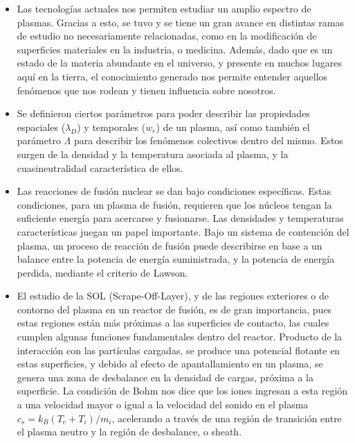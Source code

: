 \documentclass[../main.tex]{subfiles}
\begin{document}
\begin{itemize}
    \item Las tecnologías actuales nos permiten estudiar un amplio espectro de plasmas. Gracias a esto, se tuvo y se tiene un gran avance en distintas ramas de estudio no necesariamente relacionadas, como en la modificación de superficies materiales en la industria, o medicina. Además, dado que es un estado de la materia abundante en el universo, y presente en muchos lugares aquí en la tierra, el conocimiento generado nos permite entender aquellos fenómenos que nos rodean y tienen influencia sobre nosotros.
    \item Se definieron ciertos parámetros para poder describir las propiedades espaciales ($\lambda_D$) y temporales ($w_e$) de un plasma, así como también el parámetro $\Lambda$ para describir los fenómenos colectivos dentro del mismo. Estos surgen de la densidad y la temperatura asociada al plasma, y la cuasineutralidad característica de ellos. 
    \item Las reacciones de fusión nuclear se dan bajo condiciones específicas. Estas condiciones, para un plasma de fusión, requieren que los núcleos tengan la suficiente energía para acercarse y fusionarse.  Las densidades y temperaturas características juegan un papel importante. Bajo un sistema de contención del plasma, un proceso de reacción de fusión puede describirse en base a un balance entre la potencia de energía suministrada, y la potencia de energía perdida, mediante el criterio de Lawson.
    \item El estudio de la SOL (Scrape-Off-Layer), y de las regiones exteriores o de contorno del plasma en un reactor de fusión, es de gran importancia, pues estas regiones están más próximas a las superficies de contacto, las cuales cumplen algunas funciones fundamentales dentro del reactor. Producto de la interacción con las partículas cargadas, se produce una potencial flotante en estas superficies, y debido al efecto de apantallamiento en un plasma, se genera una zona de desbalance en la densidad de cargas, próxima a la superficie. La condición de Bohm nos dice que los iones ingresan a esta región a una velocidad mayor o igual a la velocidad del sonido en el plasma $c_s = k_B(T_e+T_i)/m_i$, acelerando a través de una región de transición entre el plasma neutro y la región de desbalance, o sheath.
    \end{itemize}
\end{document}
